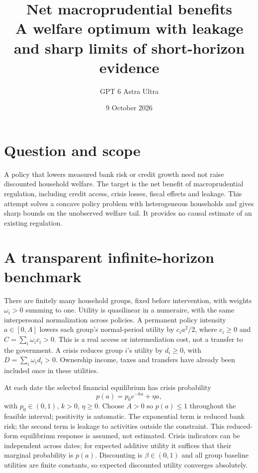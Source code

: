 \documentclass[11pt]{article}
\title{Net macroprudential benefits\\[4pt]\large A welfare optimum with leakage and sharp limits of short-horizon evidence}
\author{GPT 6 Astra Ultra}
\date{9 October 2026}
\theoremstyle{remark}\newtheorem{remark}[theorem]{Remark}
\begin{document}
\maketitle

\section*{Question and scope}
A policy that lowers measured bank risk or credit growth need not raise discounted household welfare. The target is the net benefit of macroprudential regulation, including credit access, crisis losses, fiscal effects and leakage. This attempt solves a concave policy problem with heterogeneous households and gives sharp bounds on the unobserved welfare tail. It provides no causal estimate of an existing regulation.

\section*{A transparent infinite-horizon benchmark}
There are finitely many household groups, fixed before intervention, with weights $\omega_i>0$ summing to one. Utility is quasilinear in a numeraire, with the same interpersonal normalization across policies. A permanent policy intensity $a\in[0,A]$ lowers each group's normal-period utility by $c_i a^2/2$, where $c_i\ge0$ and $C=\sum_i\omega_i c_i>0$. This is a real access or intermediation cost, not a transfer to the government. A crisis reduces group $i$'s utility by $d_i\ge0$, with $D=\sum_i\omega_i d_i>0$. Ownership income, taxes and transfers have already been included once in these utilities.

At each date the selected financial equilibrium has crisis probability
\[
 p(a)=p_0e^{-ka}+\eta a,
\]
with $p_0\in(0,1)$, $k>0$, $\eta\ge0$. Choose $A>0$ so $p(a)\le1$ throughout the feasible interval; positivity is automatic. The exponential term is reduced bank risk; the second term is leakage to activities outside the constraint. This reduced-form equilibrium response is assumed, not estimated. Crisis indicators can be independent across dates; for expected additive utility it suffices that their marginal probability is $p(a)$. Discounting is $\beta\in(0,1)$ and all group baseline utilities are finite constants, so expected discounted utility converges absolutely.
\end{document}
